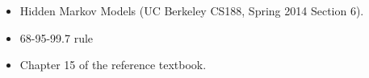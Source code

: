 \documentclass[11pt, a4paper]{article}
\begin{document}
\begin{itemize}
    \item Hidden Markov Models (UC Berkeley CS188, Spring 2014 Section 6).


    \item 68-95-99.7 rule


    \item Chapter 15 of the reference textbook.
\end{itemize}
\end{document}

